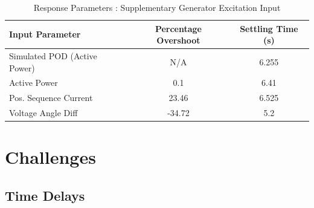 \documentclass[journal]{IEEEtran}
\begin{document}
\begin{table}[!ht]
\caption{Response Parameters : Supplementary Generator Excitation Input}\label{GENResponseTable}
\begin{center}
\begin{tabular}{|l|c|c|}
\hline \textbf{Input Parameter} & \textbf{Percentage Overshoot} & \textbf{Settling Time (s)} \\
\hline Simulated POD (Active Power) & N/A & 6.255\\ 
\hline Active Power & 0.1 & 6.41\\ 
\hline Pos. Sequence Current & 23.46 & 6.525 \\ 
\hline Voltage Angle Diff & -34.72 & 5.2 \\ 
\hline 
\end{tabular}
\end{center}
\end{table}  


\section{Challenges}\label{Challenges}

\subsection{Time Delays}
\end{document}
